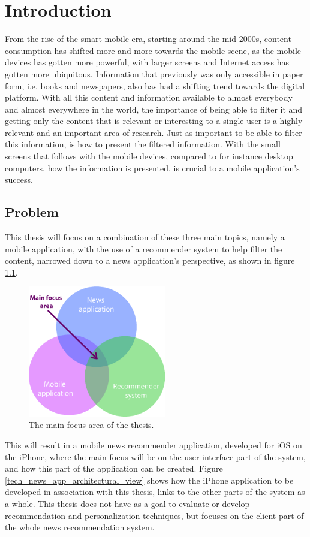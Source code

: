 \chapter{Introduction}
From the rise of the smart mobile era, starting around the mid 2000s, content consumption has shifted more and more towards the mobile scene, as the mobile devices has gotten more powerful, with larger screens and Internet access has gotten more ubiquitous. Information that previously was only accessible in paper form, i.e. books and newspapers, also has had a shifting trend towards the digital platform. With all this content and information available to almost everybody and almost everywhere in the world, the importance of being able to filter it and getting only the content that is relevant or interesting to a single user is a highly relevant and an important area of research. Just as important to be able to filter this information, is how to present the filtered information. With the small screens that follows with the mobile devices, compared to for instance desktop computers, how the information is presented, is crucial to a mobile application's success.

\section{Problem}
This thesis will focus on a combination of these three main topics, namely a mobile application, with the use of a recommender system to help filter the content, narrowed down to a news application's perspective, as shown in figure \ref{thesis_focus_area}.

\begin{figure}[!htbp]
\centering
\includegraphics[width=60mm]{GFX/figures/thesisFocusArea.png}
\caption{The main focus area of the thesis.}
\label{thesis_focus_area}
\end{figure}

This will result in a mobile news recommender application, developed for iOS on the iPhone, where the main focus will be on the user interface part of the system, and how this part of the application can be created. Figure \ref{tech_news_app_architectural_view} shows how the iPhone application to be developed in association with this thesis, links to the other parts of the system as a whole. This thesis does not have as a goal to evaluate or develop recommendation and personalization techniques, but focuses on the client part of the whole news recommendation system.

